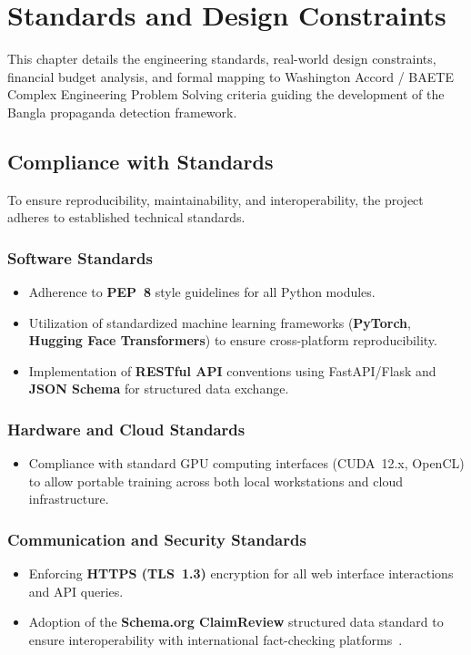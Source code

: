 \chapter{Standards and Design Constraints}
\label{ch:standards}

This chapter details the engineering standards, real-world design constraints,
financial budget analysis, and formal mapping to Washington Accord / BAETE Complex
Engineering Problem Solving criteria guiding the development of the Bangla
propaganda detection framework.

\section{Compliance with Standards}
To ensure reproducibility, maintainability, and interoperability, the project
adheres to established technical standards.

\subsection{Software Standards}
\begin{itemize}
  \item Adherence to \textbf{PEP~8} style guidelines for all Python modules.
  \item Utilization of standardized machine learning frameworks (\textbf{PyTorch},
        \textbf{Hugging Face Transformers}) to ensure cross-platform
        reproducibility.
  \item Implementation of \textbf{RESTful API} conventions using FastAPI/Flask and
        \textbf{JSON Schema} for structured data exchange.
\end{itemize}

\subsection{Hardware and Cloud Standards}
\begin{itemize}
  \item Compliance with standard GPU computing interfaces (CUDA~12.x, OpenCL) to
        allow portable training across both local workstations and cloud
        infrastructure.
\end{itemize}

\subsection{Communication and Security Standards}
\begin{itemize}
  \item Enforcing \textbf{HTTPS (TLS~1.3)} encryption for all web interface
        interactions and API queries.
  \item Adoption of the \textbf{Schema.org ClaimReview} structured data standard to
        ensure interoperability with international fact-checking
        platforms~\cite{google_claimreview}.
\end{itemize}

